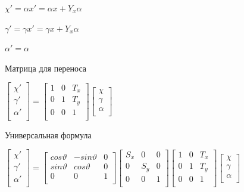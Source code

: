 \documentclass{article}
\begin{document}
$\chi ' = \alpha x' = \alpha x + Y_x \alpha$

$\gamma ' = \gamma x' = \gamma x + Y_x \alpha$

$\alpha ' = \alpha$


Матрица для переноса

$\begin{bmatrix}
    \chi' \\
    \gamma ' \\ 
    \alpha ' \\

\end{bmatrix}
=
\begin{bmatrix}
    1 & 0  & T_x \\[0.3em]
    0 & 1  & T_y \\[0.3em]
    0 & 0  & 1 \\[0.3em]
\end{bmatrix}
\begin{bmatrix}
    \chi \\
    \gamma  \\ 
    \alpha  \\
\end{bmatrix}$

Универсальная формула

$\begin{bmatrix}
    \chi' \\
    \gamma ' \\ 
    \alpha ' \\

\end{bmatrix}
=
\begin{bmatrix}
    cos \vartheta & -sin \vartheta  & 0 \\[0.3em]
    sin \vartheta &  cos \vartheta  & 0 \\[0.3em]
    0 & 0  & 1 \\[0.3em]
\end{bmatrix}
\begin{bmatrix}
    S_x & 0  & 0 \\[0.3em]
    0 & S_y  & 0 \\[0.3em]
    0 & 0  & 1 \\[0.3em]
\end{bmatrix}
\begin{bmatrix}
    1 & 0  & T_x \\[0.3em]
    0 & 1  & T_y \\[0.3em]
    0 & 0  & 1 \\[0.3em]
\end{bmatrix}
\begin{bmatrix}
    \chi \\
    \gamma  \\ 
    \alpha  \\
\end{bmatrix}$
\end{document}
